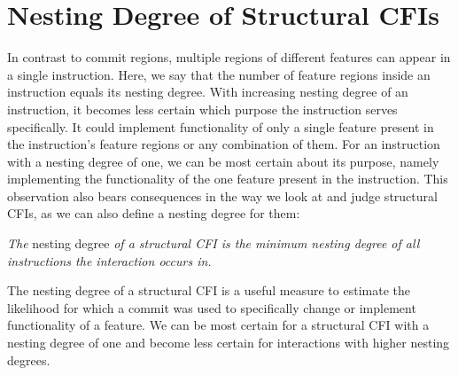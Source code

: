 \section{Nesting Degree of Structural CFIs}\label{sec:nesting_degree}

In contrast to commit regions, multiple regions of different features can appear in a single instruction.
Here, we say that the number of feature regions inside an instruction equals its nesting degree.
With increasing nesting degree of an instruction, it becomes less certain which purpose the instruction serves specifically.
It could implement functionality of only a single feature present in the instruction's feature regions or any combination of them.
For an instruction with a nesting degree of one, we can be most certain about its purpose, namely implementing the functionality of the one feature present in the instruction.
This observation also bears consequences in the way we look at and judge structural CFIs, as we can also define a nesting degree for them:
\begin{definition} \label{def:nesting_degree}
\emph{The} nesting degree \emph{of a structural CFI is the minimum nesting degree of all instructions the interaction occurs in.}
\end{definition}
The nesting degree of a structural CFI is a useful measure to estimate the likelihood for which a commit was used to specifically change or implement functionality of a feature.
We can be most certain for a structural CFI with a nesting degree of one and become less certain for interactions with higher nesting degrees. \\


